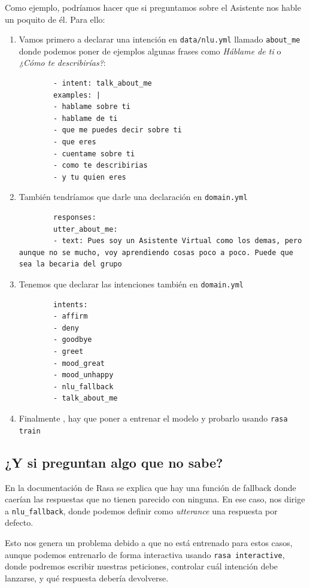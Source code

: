 Como ejemplo, podríamos hacer que si preguntamos sobre el Asistente nos hable un poquito de él. Para ello:

\begin{enumerate}
	\item Vamos primero a declarar una intención en \texttt{data/nlu.yml} llamado \texttt{about\_me} donde podemos poner de ejemplos algunas frases como \textit{Háblame de ti} o \textit{¿Cómo te describirías?}:
	\begin{lstlisting}
		- intent: talk_about_me
		examples: |
		- hablame sobre ti
		- hablame de ti
		- que me puedes decir sobre ti
		- que eres
		- cuentame sobre ti
		- como te describirias
		- y tu quien eres
	\end{lstlisting}

	\item También tendríamos que darle una declaración en \texttt{domain.yml}
	\begin{lstlisting}
		responses:
		utter_about_me:
		- text: Pues soy un Asistente Virtual como los demas, pero aunque no se mucho, voy aprendiendo cosas poco a poco. Puede que sea la becaria del grupo
	\end{lstlisting}

	\item Tenemos que declarar las intenciones también en \texttt{domain.yml}
	\begin{lstlisting}
		intents:
		- affirm
		- deny
		- goodbye
		- greet
		- mood_great
		- mood_unhappy
		- nlu_fallback
		- talk_about_me
	\end{lstlisting}

	\item Finalmente , hay que poner a entrenar el modelo y probarlo usando \texttt{rasa train}
\end{enumerate}

\subsection{¿Y si preguntan algo que no sabe?}

En la documentación de Rasa se explica que hay una función de fallback \cite{rasa-fallback} donde caerían las respuestas que no tienen parecido con ninguna. En ese caso, nos dirige a \texttt{nlu\_fallback}, donde podemos definir como \textit{utterance} una respuesta por defecto.

Esto nos genera un problema debido a que no está entrenado para estos casos, aunque podemos entrenarlo de forma interactiva usando \texttt{rasa interactive}, donde podremos escribir nuestras peticiones, controlar cuál intención debe lanzarse, y qué respuesta debería devolverse. 

